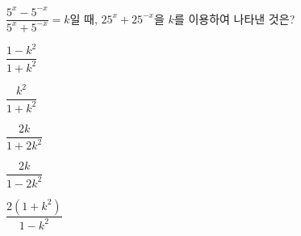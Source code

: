 $\dfrac{5^x-5^{-x}}{5^x+5^{-x}}=k$일 때, $25^x+25^{-x}$을 $k$를 이용하여 나타낸 것은? 
\begin{choices32}{\rule[-3ex]{0pt}{8ex}$\dfrac{1-k^2}{1+k^2}$}{\rule[-3ex]{0pt}{8ex}$\dfrac{k^2}{1+k^2}$}{\rule[-3ex]{0pt}{8ex}$\dfrac{2k}{1+2k^2}$}{\rule[-3ex]{0pt}{8ex}$\dfrac{2k}{1-2k^2}$}{\rule[-3ex]{0pt}{8ex}$\dfrac{2(1+k^2)}{1-k^2}$}\end{choices32}
